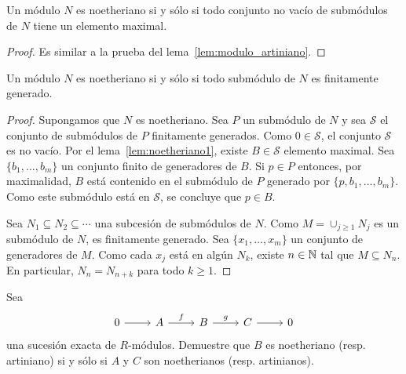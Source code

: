 \begin{lemma}
	\label{lem:noetheriano1}
	Un módulo $N$ es noetheriano si y sólo si todo conjunto no vacío de
	submódulos de $N$ tiene un elemento maximal.
\end{lemma}

\begin{proof}
	Es similar a la prueba del lema~\ref{lem:modulo_artiniano}.
\end{proof}

\begin{lemma}
	\label{lem:noetheriano2}
	Un módulo $N$ es noetheriano si y sólo si todo submódulo de $N$ es
	finitamente generado.
\end{lemma}

\begin{proof}
	Supongamos que $N$ es noetheriano. Sea $P$ un submódulo de $N$ y sea
	$\mathcal{S}$ el conjunto de submódulos de $P$ finitamente generados. Como
	$0\in\mathcal{S}$, el conjunto $\mathcal{S}$ es no vacío. Por el
	lema~\ref{lem:noetheriano1}, existe $B\in\mathcal{S}$ elemento maximal.
	Sea $\{b_1,\dots,b_m\}$ un conjunto finito de generadores de $B$. Si $p\in
	P$ entonces, por maximalidad, $B$ está contenido en el submódulo de $P$
	generado por $\{p,b_1,\dots,b_m\}$. Como este submódulo está en
	$\mathcal{S}$, se concluye que $p\in B$.

	Sea $N_1\subseteq N_2\subseteq\cdots$ una subcesión de submódulos de $N$.
	Como $M=\cup_{j\geq1}N_j$ es un submódulo de $N$, es finitamente generado.
	Sea $\{x_1,\dots,x_m\}$ un conjunto de generadores de $M$. Como cada $x_j$
	está en algún $N_k$, existe $n\in\mathbb{N}$ tal que $M\subseteq N_n$. En
	particular, $N_{n}=N_{n+k}$ para todo $k\geq1$. 
\end{proof}

\begin{exercise}
	\label{exercise:noetheriano:exact}
	Sea 
	\[
	\begin{tikzcd}
		0 \arrow{r}
		& A \arrow{r}{f}
		& B \arrow{r}{g}
		& C \arrow{r}
		& 0
	\end{tikzcd}
	\]
	una sucesión exacta de $R$-módulos. Demuestre que $B$ es noetheriano (resp.
	artiniano) si y sólo si $A$ y $C$ son noetherianos (resp. artinianos).
\end{exercise}

%
%


